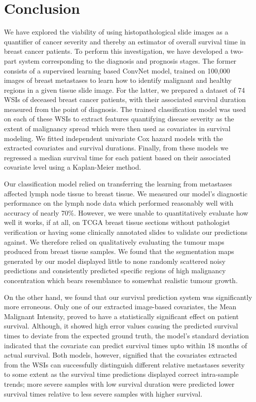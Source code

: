 \documentclass{l4proj}
\begin{document}
\chapter{Conclusion}    
We have explored the viability of using histopathological slide images as a quantifier of cancer severity and thereby an estimator of overall survival time in breast cancer patients. To perform this investigation, we have developed a two-part system corresponding to the diagnosis and prognosis stages. The former consists of a supervised learning based ConvNet model, trained on 100,000 images of breast metastases to learn how to identify malignant and healthy regions in a given tissue slide image. For the latter, we prepared a dataset of 74 WSIs of deceased breast cancer patients, with their associated survival duration measured from the point of diagnosis. The trained classification model was used on each of these WSIs to extract features quantifying disease severity as the extent of malignancy spread which were then used as covariates in survival modeling. We fitted independent univariate Cox hazard models with the extracted covariates and survival durations. Finally, from these models we regressed a median survival time for each patient based on their associated covariate level using a Kaplan-Meier method. 

Our classification model relied on transferring the learning from metastases affected lymph node tissue to breast tissue. We measured our model's diagnostic performance on the lymph node data which performed reasonably well with accuracy of nearly 70\%. However, we were unable to quantitatively evaluate how well it works, if at all, on TCGA breast tissue sections without pathologist verification or having some clinically annotated slides to validate our predictions against. We therefore relied on qualitatively evaluating the tumour maps produced from breast tissue samples. We found that the segmentation maps generated by our model displayed little to none randomly scattered noisy predictions and consistently predicted specific regions of high malignancy concentration which bears resemblance to somewhat realistic tumour growth. 

On the other hand, we found that our survival prediction system was significantly more erroneous. Only one of our extracted image-based covariates, the Mean Malignant Intensity, proved to have a statistically significant effect on patient survival. Although, it showed high error values causing the predicted survival times to deviate from the expected ground truth, the model's standard deviation indicated that the covariate can predict survival times upto within 18 months of actual survival. Both models, however, signified that the covariates extracted from the WSIs can successfully distinguish different relative metastases severity to some extent as the survival time predictions displayed correct intra-sample trends; more severe samples with low survival duration were predicted lower survival times relative to less severe samples with higher survival. 
\end{document}

